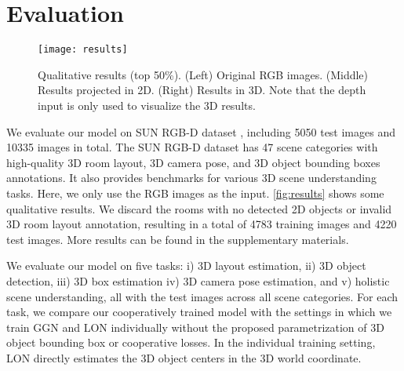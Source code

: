 \documentclass{article}
\makeatletter
\renewcommand{\paragraph}{\@startsection{paragraph}{4}{\z@}{0ex \@plus 0ex \@minus 0ex}{-1em}{\hskip\parindent\normalfont\normalsize\bfseries}}
\makeatother
\begin{document}
\section{Evaluation}

\begin{figure}[t!]
    \begin{center}
        \texttt{[image: results]}
    \end{center}
    \caption{Qualitative results (top 50\%). (Left) Original RGB images. (Middle) Results projected in 2D. (Right) Results in 3D. Note that the depth input is only used to visualize the 3D results.}
    \label{fig:results}
\end{figure}

We evaluate our model on SUN RGB-D dataset \citep{song2015sun}, including 5050 test images and 10335 images in total. The SUN RGB-D dataset has 47 scene categories with high-quality 3D room layout, 3D camera pose, and 3D object bounding boxes annotations. It also provides benchmarks for various 3D scene understanding tasks. Here, we only use the RGB images as the input. \autoref{fig:results} shows some qualitative results. We discard the rooms with no detected 2D objects or invalid 3D room layout annotation, resulting in a total of 4783 training images and 4220 test images. More results can be found in the supplementary materials.

We evaluate our model on five tasks: i) 3D layout estimation, ii) 3D object detection, iii) 3D box estimation iv) 3D camera pose estimation, and v) holistic scene understanding, all with the test images across all scene categories. For each task, we compare our cooperatively trained model with the settings in which we train GGN and LON individually without the proposed parametrization of 3D object bounding box or cooperative losses. In the individual training setting, LON directly estimates the 3D object centers in the 3D world coordinate.

\paragraph{3D Layout Estimation}
\end{document}
